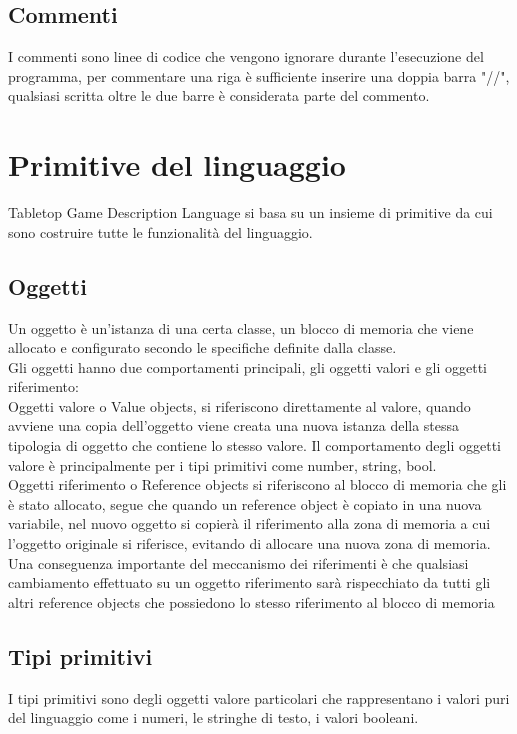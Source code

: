  
\subsection{Commenti}
I commenti sono linee di codice che vengono ignorare durante l'esecuzione del programma, 
per commentare una riga è sufficiente inserire una doppia barra "//", qualsiasi scritta oltre 
le due barre è considerata parte del commento.

\section{Primitive del linguaggio}
Tabletop Game Description Language si basa su un insieme di primitive da cui sono costruire tutte 
le funzionalità del linguaggio.

 
\subsection{Oggetti}
Un oggetto è un'istanza di una certa classe, un blocco di memoria che viene allocato e configurato secondo
le specifiche definite dalla classe. \\
Gli oggetti hanno due comportamenti principali, gli oggetti valori e gli oggetti riferimento:
\\
Oggetti valore o Value objects, si riferiscono direttamente al valore, quando avviene una copia dell'oggetto
viene creata una nuova istanza della stessa tipologia di oggetto che contiene lo stesso valore.
Il comportamento degli oggetti valore è principalmente per i tipi primitivi come number, string, bool.
\\
Oggetti riferimento o Reference objects si riferiscono al blocco di memoria che gli è stato allocato,
segue che quando un reference object è copiato in una nuova variabile, nel nuovo oggetto si copierà 
il riferimento alla zona di memoria a cui l'oggetto originale si riferisce, evitando di allocare una
nuova zona di memoria. 
\\
Una conseguenza importante del meccanismo dei riferimenti è che qualsiasi cambiamento effettuato su un
oggetto riferimento sarà rispecchiato da tutti gli altri reference objects che possiedono lo stesso riferimento
al blocco di memoria

\newpage
\subsection{Tipi primitivi}
I tipi primitivi sono degli oggetti valore particolari che rappresentano i valori puri del linguaggio come
i numeri, le stringhe di testo, i valori booleani.

